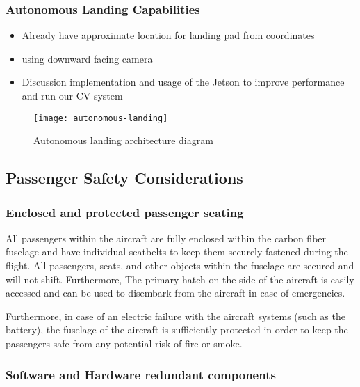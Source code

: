 \subsubsection{Autonomous Landing Capabilities}


\begin{itemize}
	\item Already have approximate location for landing pad from coordinates
	\item using downward facing camera 
	\item Discussion implementation and usage of the Jetson to improve performance
		and run our CV system
\end{itemize}

\begin{figure}[h]
	\caption{Autonomous landing architecture diagram}
	\centering
	\texttt{[image: autonomous-landing]}
\end{figure}

\subsection{Passenger Safety Considerations}

\subsubsection{Enclosed and protected passenger seating}

All passengers within the aircraft are fully enclosed within the carbon fiber
fuselage and have individual seatbelts to keep them securely fastened during
the flight. All passengers, seats, and other objects within the fuselage are
secured and will not shift. Furthermore, The primary hatch on the side of the
aircraft is easily accessed and can be used to disembark from the aircraft in
case of emergencies.

Furthermore, in case of an electric failure with the aircraft systems (such as the battery), the fuselage of the aircraft is sufficiently protected in order to keep the passengers safe from any potential risk of fire or smoke.

\subsubsection{Software and Hardware redundant components}


